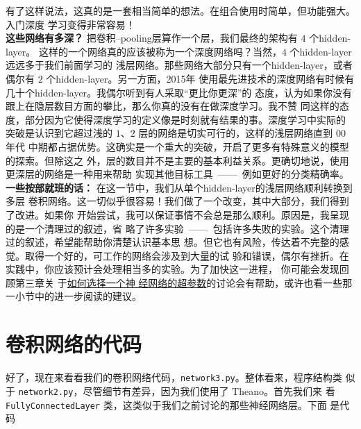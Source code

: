 有了这样说法，这真的是一套相当简单的想法。在组合使用时简单，但功能强大。入门深度
学习变得非常容易！\\

\textbf{这些网络有多深？} 把卷积--\gls*{pooling}层算作一个层，我们最终的架构有 $4$ 个\gls*{hidden-layer}。
这样的一个网络真的应该被称为一个深度网络吗？当然，$4$ 个\gls*{hidden-layer}远远多于我们前面学习的
浅层网络。那些网络大部分只有一个\gls*{hidden-layer}，或者偶尔有 $2$ 个\gls*{hidden-layer}。另一方面，2015年
使用最先进技术的深度网络有时候有几十个\gls*{hidden-layer}。我偶尔听到有人采取“更比你更深”的
态度，认为如果你没有跟上在隐层数目方面的攀比，那么你真的没有在做深度学习。我不赞
同这样的态度，部分因为它使得深度学习的定义像是时刻就有结果的事。深度学习中实际的
突破是认识到它超过浅的 $1$、$2$ 层的网络是切实可行的，这样的浅层网络直到 00 年代
中期都占据优势。这确实是一个重大的突破，开启了更多有特殊意义的模型的探索。但除这之
外，层的数目并不是主要的基本利益关系。更确切地说，使用更深层的网络是一种用来帮助
实现其他目标工具~——~例如更好的分类精确率。
\\

\textbf{一些按部就班的话：} 在这一节中，我们从单个\gls*{hidden-layer}的浅层网络顺利转换到多层
卷积网络。这一切似乎很容易！我们做了一个改变，其中大部分，我们得到了改进。如果你
开始尝试，我可以保证事情不会总是那么顺利。原因是，我呈现的是一个清理过的叙述，省
略了许多实验~——~包括许多失败的实验。这个清理过的叙述，希望能帮助你清楚认识基本思
想。但它也有风险，传达着不完整的感觉。取得一个好的，可工作的网络会涉及到大量的试
验和错误，偶尔有挫折。在实践中，你应该预计会处理相当多的实验。为了加快这一进程，
你可能会发现回顾第三章关
于\hyperref[sec:how_to_choose_a_neural_network's_hyper-parameters]{如何选择一个神
  经网络的超参数}的讨论会有帮助，或许也看一些那一小节中的进一步阅读的建议。

\section{卷积网络的代码}
\label{sec:the_code_for_our_convolutional_networks}

好了，现在来看看我们的卷积网络代码，\lstinline!network3.py!。整体看来，程序结构类
似于 \lstinline!network2.py!，尽管细节有差异，因为我们使用了 Theano。首先我们来
看 \lstinline!FullyConnectedLayer! 类，这类似于我们之前讨论的那些神经网络层。下面
是代码

